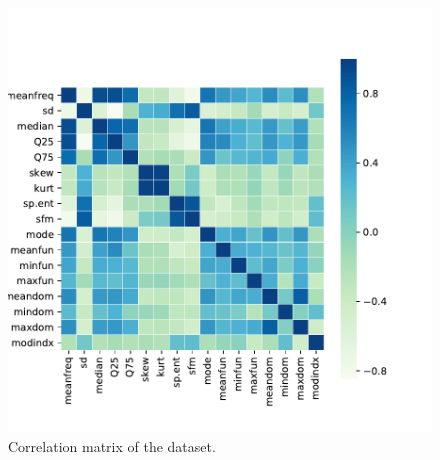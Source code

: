 \begin{figure}[htb]
	\centering
	\includegraphics[height=\BoxPlotFigHeight]{figures/correlation_matrix.pdf}
	\caption{Correlation matrix of the dataset.}
	\label{fig_corr_matrix}
\end{figure}
\setlength{\BoxPlotFigWidth}{0.48\textwidth}
